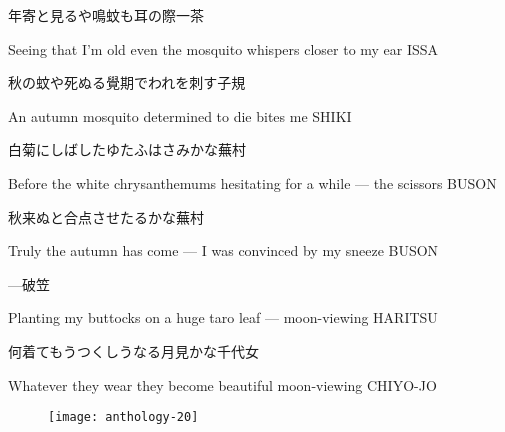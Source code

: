 \begin{haiku}
    {\FH 年寄と見るや鳴蚊も耳の際}\hfill{\FH 一茶}

    \vin{} Seeing that I'm old
    \vin{} \vin{} even the mosquito whispers
    \vin{} \vin{} \vin{} closer to my ear \hspace{\fill} ISSA
\end{haiku}

\begin{haiku}
    {\FH 秋の蚊や死ぬる覺期でわれを刺す}\hfill{\FH 子規}

    \vin{} An autumn mosquito
    \vin{} \vin{} determined to die
    \vin{} \vin{} \vin{} bites me \hspace{\fill} SHIKI
\end{haiku}

\begin{haiku}
    {\FH 白菊にしばしたゆたふはさみかな}\hfill{\FH 蕪村}

    \vin{} Before the white chrysanthemums
    \vin{} \vin{} hesitating for a while ---
    \vin{} \vin{} \vin{} the scissors \hspace{\fill} BUSON
\end{haiku}

\begin{haiku}
    {\FH 秋来ぬと合点させたるかな}\hfill{\FH 蕪村}

    \vin{} Truly the autumn has come ---
    \vin{} \vin{} I was convinced
    \vin{} \vin{} \vin{} by my sneeze \hspace{\fill} BUSON
\end{haiku}

\begin{haiku}
    {---}\hfill{\FH 破笠}

    \vin{} Planting my buttocks
    \vin{} \vin{} on a huge taro leaf ---
    \vin{} \vin{} \vin{} moon-viewing \hspace{\fill} HARITSU
\end{haiku}

\begin{haiku}
    {\FH 何着てもうつくしうなる月見かな}\hfill{\FH 千代女}

    \vin{} Whatever they wear
    \vin{} \vin{} they become beautiful
    \vin{} \vin{} \vin{} moon-viewing \hspace{\fill} CHIYO-JO
\end{haiku}

\begin{figure}
    \texttt{[image: anthology-20]}
\end{figure}

